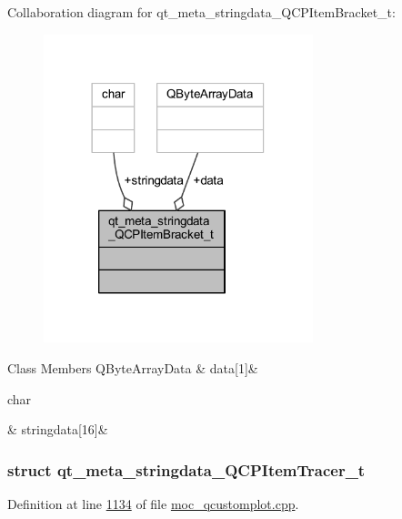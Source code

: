 Collaboration diagram for qt\+\_\+meta\+\_\+stringdata\+\_\+\+Q\+C\+P\+Item\+Bracket\+\_\+t\+:
\nopagebreak
\begin{figure}[H]
\begin{center}
\leavevmode
\includegraphics[width=222pt]{d0/d81/a00180}
\end{center}
\end{figure}
\begin{DoxyFields}{Class Members}
\hypertarget{a00016_a15ff7a0bed3ecf746215a57a076c296b}{Q\+Byte\+Array\+Data}\label{a00016_a15ff7a0bed3ecf746215a57a076c296b}
&
data\mbox{[}1\mbox{]}&
\\
\hline

\hypertarget{a00016_a2e0cf4afc3bc921fbe6f35930bfbd9af}{char}\label{a00016_a2e0cf4afc3bc921fbe6f35930bfbd9af}
&
stringdata\mbox{[}16\mbox{]}&
\\
\hline

\end{DoxyFields}
\label{d3/d00/a00113}
\hypertarget{a00016_d3/d00/a00113}{}
\subsubsection{struct qt\+\_\+meta\+\_\+stringdata\+\_\+\+Q\+C\+P\+Item\+Tracer\+\_\+t}


Definition at line \hyperlink{a00016_source_l01134}{1134} of file \hyperlink{a00016_source}{moc\+\_\+qcustomplot.\+cpp}.



